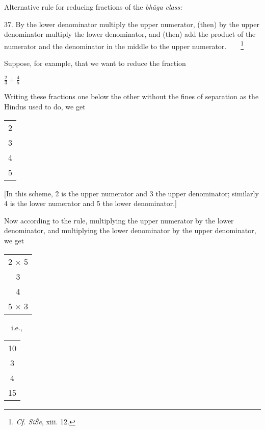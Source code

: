 \documentclass[10pt, openany]{book}
\begin{document}
{{{{{{{{{{{{{{{{{{{{\begin{sloppypar}
\noindent Alternative rule for reducing fractions of the \textit {bhāga class:}
\vspace{3mm}

 37. By the lower denominator multiply the upper
numerator, (then) by the upper denominator multiply the
lower denominator, and (then) add the product of the
numerator and the denominator in the middle to the upper
numerator.~~~~\renewcommand{\thefootnote}{\hspace{-4.5mm} 3}\footnote{\hspace{-2mm} \en \textit{Cf. SiŚe}, xiii. 12.}
\vspace{3mm}

{\small Suppose, for example, that we want to reduce the fraction
\vspace{2mm}

\hspace{20mm} $\frac{2}{3} + \frac{4}{5}$}

\end{sloppypar}

\newpage

\begin{sloppypar}

{\small  Writing these fractions one below the other without the fines of
separation as the Hindus used to do, we get
\vspace{1mm}

\hspace{30mm} \begin{tabular}{c} 2\\3\\ 4 \\5\end{tabular}
\vspace{3mm}

[In this scheme, 2 is the upper numerator and 3 the upper denominator; similarly 4 is the lower numerator and 5 the lower
denominator.]
\vspace{3mm}

 Now according to the rule, multiplying the upper numerator by the
lower denominator, and multiplying the lower denominator by the upper
denominator, we get
\vspace{3mm}

\hspace{20mm} \begin{tabular}{c} 2 $\times$ 5 \\ 3\\ 4\\ 5 $\times$ 3\end{tabular}
~~i.e.,~~
\begin{tabular}{c}10\\3\\4\\15\end{tabular}
\vspace{3mm}

}
\end{sloppypar}}}}}}}}}}}}}}}}}}}}}
\end{document}
